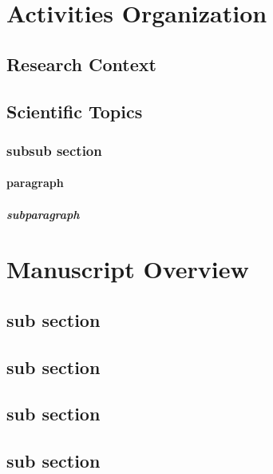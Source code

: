 \section{Activities Organization}\label{sec:activities}

\subsection{Research Context}\label{sec:research:context}
\subsection{Scientific Topics}\label{sec:research}

\subsubsection{subsub section}\label{sec:subsubsection}
\paragraph{paragraph}\label{sec:paragraph}
\subparagraph{subparagraph}\label{sec:subparagraph}

\section{Manuscript Overview}\label{sec:org}



\subsection{sub section}\label{sec:subsectionA}
\subsection{sub section}\label{sec:subsectionB}
\subsection{sub section}\label{sec:subsectionC}
\subsection{sub section}\label{sec:subsectionD}




\endinput
